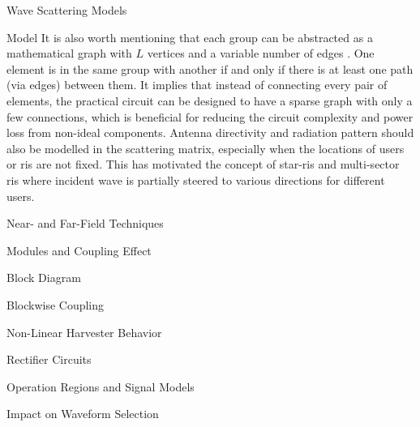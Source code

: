 \begin{section}{}
\begin{subsection}{Wave Scattering Models}
\begin{subsection}{ Model}
			It is also worth mentioning that each group can be abstracted as a mathematical graph with $L$ vertices and a variable number of edges \cite{Nerini2023a}.
			One element is in the same group with another if and only if there is at least one path (via edges) between them.
			It implies that instead of connecting every pair of elements, the practical circuit can be designed to have a sparse graph with only a few connections, which is beneficial for reducing the circuit complexity and power loss from non-ideal components.
			Antenna directivity and radiation pattern should also be modelled in the scattering matrix, especially when the locations of users or \gls{ris} are not fixed.
			This has motivated the concept of \gls{star}-\gls{ris} \cite{Mu2021,Liu2021} and multi-sector \gls{ris} \cite{Li2023c} where incident wave is partially steered to various directions for different users.

		\end{subsection}

	\end{subsection}

\end{section}

\begin{section}{}
	\begin{subsection}{Near- and Far-Field Techniques}

	\end{subsection}

	\begin{subsection}{Modules and Coupling Effect}
		\begin{subsubsection}{Block Diagram}

		\end{subsubsection}

		\begin{subsubsection}{Blockwise Coupling}

		\end{subsubsection}
	\end{subsection}

	\begin{subsection}{Non-Linear Harvester Behavior}
		\begin{subsubsection}{Rectifier Circuits}

		\end{subsubsection}

		\begin{subsubsection}{Operation Regions and Signal Models}

		\end{subsubsection}

		\begin{subsubsection}{Impact on Waveform Selection}

		\end{subsubsection}
	\end{subsection}
\end{section}

